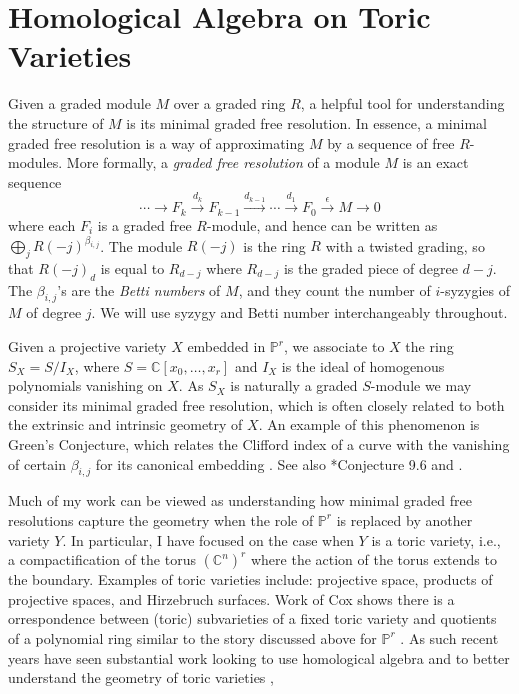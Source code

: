 \documentclass[11pt,reqno]{amsart}
\theoremstyle{remark}
\newcommand{\C}{\mathbb{C}}
\renewcommand{\P}{\mathbb{P}}
\begin{document}
\section{Homological Algebra on Toric Varieties}

Given a graded module $M$ over a graded ring $R$, a helpful tool for understanding the structure of $M$ is its minimal graded free resolution. In essence, a minimal graded free resolution is a way of approximating $M$ by a sequence of free $R$-modules. More formally, a \textit{graded free resolution} of a module $M$ is an exact sequence 
\[
\cdots \xrightarrow{} F_{k} \xrightarrow{d_{k}} F_{k-1} \xrightarrow{d_{k-1}} \cdots \xrightarrow{d_{1}} F_{0}\xrightarrow{\epsilon}M\xrightarrow{} 0
\]
where each $F_{i}$ is a graded free $R$-module, and hence can be written as $\bigoplus_{j}R(-j)^{\beta_{i,j}}$. The module $R(-j)$ is the ring $R$ with a twisted grading, so that $R(-j)_{d}$ is equal to $R_{d-j}$ where $R_{d-j}$ is the graded piece of degree $d-j$. The $\beta_{i,j}$'s are the \textit{Betti numbers} of $M$, and they count the number of $i$-syzygies of $M$ of degree $j$. We will use syzygy and Betti number interchangeably throughout. 

Given a projective variety $X$ embedded in $\P^r$, we associate to $X$ the ring $S_X=S/I_X$, where $S=\C[x_0,\ldots,x_r]$ and $I_X$ is the ideal of homogenous polynomials vanishing on $X$. As $S_X$ is naturally a graded $S$-module we may consider its minimal graded free resolution, which is often closely related to both the extrinsic and intrinsic geometry of $X$.  An example of this phenomenon
 is Green's Conjecture, which relates the Clifford index of a curve with the vanishing of certain $\beta_{i,j}$ for its canonical embedding \cite{voisin02, voisin05, aproduFarkas19}. See also \cite{eisenbud05}*{Conjecture 9.6} and \cite{schreyer86, bayerEisenbud91,farkasPopa05, farkas06,aproduFarkas11,farkasKemeny16,farkasKemeny17}.
 
 Much of my work can be viewed as understanding how minimal graded free resolutions capture the geometry when the role of $\P^{r}$ is replaced by another variety $Y$. In particular, I have focused on the case when $Y$ is a toric variety, i.e., a compactification of the torus $(\C^{n})^{r}$ where the action of the torus extends to the boundary. Examples of toric varieties include: projective space, products of projective spaces, and Hirzebruch surfaces. Work of Cox shows there is a orrespondence between (toric) subvarieties of a fixed toric variety and quotients of a polynomial ring similar to the story discussed above for $\P^{r}$ \cite{cox95}. As such recent years have seen substantial work looking to use homological algebra and to better understand the geometry of toric varieties \cite{almousaBruce19,berkeschErmanSmith17,brownErman22,brownErman23,BB21,cartwrightErmanVelscoViray09,EES15,GVT15,maclaganSmith04,maclaganSmith05},
\end{document}
